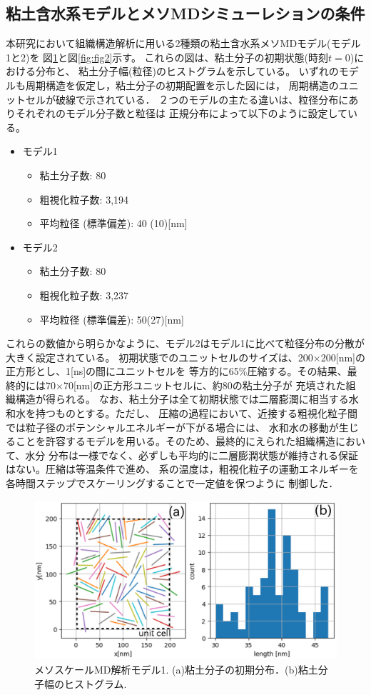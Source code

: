 \subsection{粘土含水系モデルとメソMDシミューレションの条件}
本研究において組織構造解析に用いる2種類の粘土含水系メソMDモデル(モデル1と2)を
図\ref{fig:fig1}と図\ref{fig:fig2}示す。
これらの図は、粘土分子の初期状態(時刻$t=0$)における分布と、 粘土分子幅(粒径)のヒストグラムを示している。
いずれのモデルも周期構造を仮定し，粘土分子の初期配置を示した図には，
周期構造のユニットセルが破線で示されている．
２つのモデルの主たる違いは、粒径分布にありそれぞれのモデル分子数と粒径は
正規分布によって以下のように設定している。
\begin{itemize}
\item
モデル1
	\begin{itemize}
		\item 粘土分子数: 80
		\item 粗視化粒子数: 3,194
		\item 平均粒径 (標準偏差): 40 (10)[{\rm nm}]
	\end{itemize}
\item
モデル2
	\begin{itemize}
		\item 粘土分子数: 80
		\item 粗視化粒子数: 3,237
		\item 平均粒径 (標準偏差): 50(27)[{\rm nm}]
	\end{itemize}
\end{itemize}
これらの数値から明らかなように、モデル2はモデル1に比べて粒径分布の分散が大きく設定されている。
初期状態でのユニットセルのサイズは、200$\times$200[nm]の正方形とし、1[ns]の間にユニットセルを
等方的に65\%圧縮する。その結果、最終的には70$\times$70[nm]の正方形ユニットセルに、約80の粘土分子が
充填された組織構造が得られる。
なお、粘土分子は全て初期状態では二層膨潤に相当する水和水を持つものとする。ただし、
圧縮の過程において、近接する粗視化粒子間では粒子径のポテンシャルエネルギーが下がる場合には、
水和水の移動が生じることを許容するモデルを用いる。そのため、最終的にえられた組織構造において、水分
分布は一様でなく、必ずしも平均的に二層膨潤状態が維持される保証はない。圧縮は等温条件で進め、
系の温度は，粗視化粒子の運動エネルギーを各時間ステップでスケーリングすることで一定値を保つように
制御した．
\begin{figure}[h]
	\begin{center}
	\includegraphics[width=0.8\linewidth]{Figs/fig1.eps} 
	\end{center}
	\caption{
		メソスケールMD解析モデル1. (a)粘土分子の初期分布．(b)粘土分子幅のヒストグラム. 
	} 
	\label{fig:fig1}
\end{figure}
